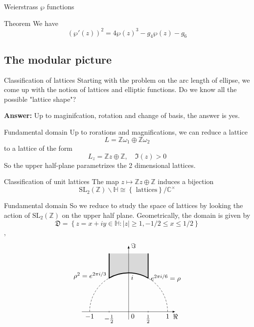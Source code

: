 \documentclass[pdf]{beamer}
\begin{document}
\begin{frame}{Weierstrass $\wp$ functions}
    \begin{block}{Theorem }
        We have
        \[(\wp'(z))^2 = 4\wp(z)^3-g_4\wp(z)-g_6\]
    \end{block}
\end{frame}
\subsection{The modular picture}
\begin{frame}{Classification of lattices}
    Starting with the problem on the arc length of ellipse, we come up with the notion of lattices and elliptic functions. Do we know all the possible "lattice shape"?\vspace{3em}

    \pause
    \textbf{Answer:} Up to maginifcation, rotation and change of basis, the answer is yes.
\end{frame}
\begin{frame}{Fundamental domain}
    Up to rorations and magnifications, we can reduce a lattice
    \[L = \mathbb{Z}\omega_1 \oplus \mathbb{Z}\omega_2\]
    to a lattice of the form
    \[L_z = \mathbb{Z}z\oplus\mathbb{Z}, \quad \Im(z)>0\]
    So the upper half-plane parametrizes the 2 dimensional lattices.
    \begin{block}{Classification of unit lattices}
        The map $z \mapsto \mathbb{Z}z\oplus\mathbb{Z}$ induces a bijection
        \[\text{SL}_2(\mathbb{Z}) \backslash\mathbb{H} \cong \left\lbrace \text{ lattices}\right\rbrace/\mathbb{C^\times}\]
    \end{block}

\end{frame}
\begin{frame}{Fundamental domain}
    So we reduce to study the space of lattices by looking the action of $\text{SL}_2(\mathbb{Z})$ on the upper half plane. Geometrically, the domain is given by
    \[\mathfrak{D} = \left\lbrace z=x+iy \in \mathbb{H}: |z| \ge 1,-1/2 \le x \le 1/2 \right\rbrace \],
    \pause
    \[
        \begin{tikzpicture}[scale=2]
            \draw[densely dashed] (1,0) arc (0:60:1) (-1,0) arc (180:120:1);
            \draw[very thick, fill=gray!30] (.5,1.5) --node[right, pos=1]{$e^{2\pi i/6}=\rho$} (60:1) arc (60:120:1)
            --node[left, pos=.1]{$\rho^2=e^{2\pi i/3}$} (-.5,1.5);
            \draw[-latex] (-1.2,0) -- (1.2,0)node[below]{$\Re$};
            \draw[-latex] (0,-.2) -- (0,1.7)node[right]{$\Im$};
            \path(-1,0) --node[below, pos=0]{$-1$}node[below right, pos=.5]{0}node[below, pos=1]{1} (1,0)
            (0,1)node[below right]{$i$};
            \draw(-.5,.02)--(-.5,-.02)node[below]{$-\frac{1}{2}$}(.5,.02)--(.5,-.02)node[below]{$\frac{1}{2}$};
        \end{tikzpicture}\]
\end{frame}
\end{document}
